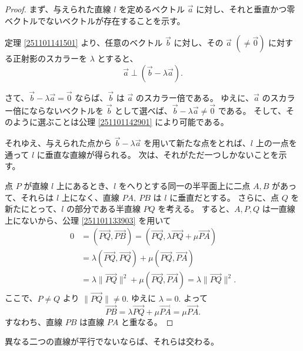 \begin{proof}
  まず、与えられた直線 \(l\) を定めるベクトル \(\vec{a}\) に対し、それと垂直かつ零ベクトルでないベクトルが存在することを示す。

  定理 \ref{251101141501} より、任意のベクトル \(\vec{b}\) に対し、その \(\vec{a}\) \((\neq\vec{0})\) に対する正射影のスカラーを \(\lambda\) とすると、
  \[\vec{a}\perp(\vec{b}-\lambda\vec{a}).\]

  さて、\(\vec{b}-\lambda\vec{a}=\vec{0}\) ならば、\(\vec{b}\) は \(\vec{a}\) のスカラー倍である。
  ゆえに、\(\vec{a}\) のスカラー倍にならないベクトルを \(\vec{b}\) として選べば、\(\vec{b}-\lambda\vec{a}\neq\vec{0}\) である。
  そして、そのように選ぶことは公理 \ref{251101142901} により可能である。

  それゆえ、与えられた点から \(\vec{b}-\lambda\vec{a}\) を用いて新たな点をとれば、\(l\) 上の一点を通って \(l\) に垂直な直線が得られる。
  次は、それがただ一つしかないことを示す。

  点 \(P\) が直線 \(l\) 上にあるとき、\(l\) をへりとする同一の半平面上に二点 \(A,B\) があって、それらは \(l\) 上になく、直線 \(PA,\:PB\) は \(l\) に垂直だとする。
  さらに、点 \(Q\) を新たにとって、\(l\) の部分である半直線 \(PQ\) を考える。
  すると、\(A,P,Q\) は一直線上にないから、公理 \ref{251101133903} を用いて
  \begin{align*}
    0 &= (\overrightarrow{PQ},\overrightarrow{PB})=(\overrightarrow{PQ},\lambda\overrightarrow{PQ}+\mu\overrightarrow{PA}) \\
      &= \lambda(\overrightarrow{PQ},\overrightarrow{PQ})+\mu(\overrightarrow{PQ},\overrightarrow{PA}) \\
      &= \lambda\|\overrightarrow{PQ}\|^2+\mu(\overrightarrow{PQ},\overrightarrow{PA})=\lambda\|\overrightarrow{PQ}\|^2.
  \end{align*}
  ここで、\(P\neq Q\) より \(\|\overrightarrow{PQ}\|\neq0.\)
  ゆえに \(\lambda=0.\)
  よって
  \[\overrightarrow{PB}=\lambda\overrightarrow{PQ}+\mu\overrightarrow{PA}=\mu\overrightarrow{PA}.\]
  すなわち、直線 \(PB\) は直線 \(PA\) と重なる。
\end{proof}

\begin{thm}
  異なる二つの直線が平行でないならば、それらは交わる。
\end{thm}

